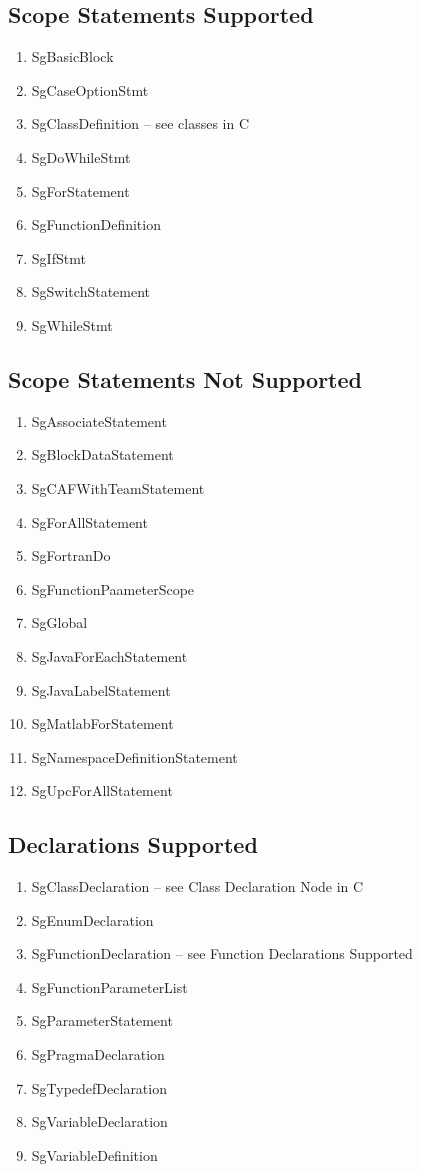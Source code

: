 \documentclass[11pt]{article}
\begin{document}
{\begin{enumeration}
\subsection{Scope Statements Supported}
\begin{enumerate}
\item SgBasicBlock
\item SgCaseOptionStmt
\item SgClassDefinition -- see classes in C
\item SgDoWhileStmt
\item SgForStatement
\item SgFunctionDefinition
\item SgIfStmt
\item SgSwitchStatement
\item SgWhileStmt
\end{enumerate}

\subsection{Scope Statements Not Supported}
\begin{enumerate}
\item SgAssociateStatement
\item SgBlockDataStatement
\item SgCAFWithTeamStatement
\item SgForAllStatement
\item SgFortranDo
\item SgFunctionPaameterScope
\item SgGlobal
\item SgJavaForEachStatement
\item SgJavaLabelStatement
\item SgMatlabForStatement
\item SgNamespaceDefinitionStatement
\item SgUpcForAllStatement
\end{enumerate}


\subsection{Declarations Supported}
\begin{enumerate}
\item SgClassDeclaration -- see Class Declaration Node in C
\item SgEnumDeclaration
\item SgFunctionDeclaration -- see Function Declarations Supported
\item SgFunctionParameterList
\item SgParameterStatement
\item SgPragmaDeclaration
\item SgTypedefDeclaration
\item SgVariableDeclaration
\item SgVariableDefinition
\end{enumerate}



\end{enumeration}}
\end{document}
